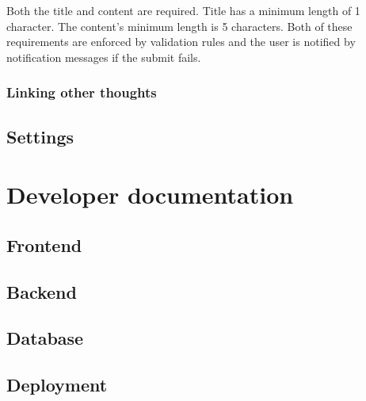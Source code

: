 Both the title and content are required. Title has a minimum length of 1 character. The content's minimum length is 5 characters.
Both of these requirements are enforced by validation rules and the user is notified by notification messages if the submit fails.

\subsubsection*{Linking other thoughts}

\subsection{Settings}

\section{Developer documentation}

\subsection{Frontend}

\subsection{Backend}

\subsection{Database}

\subsection{Deployment}